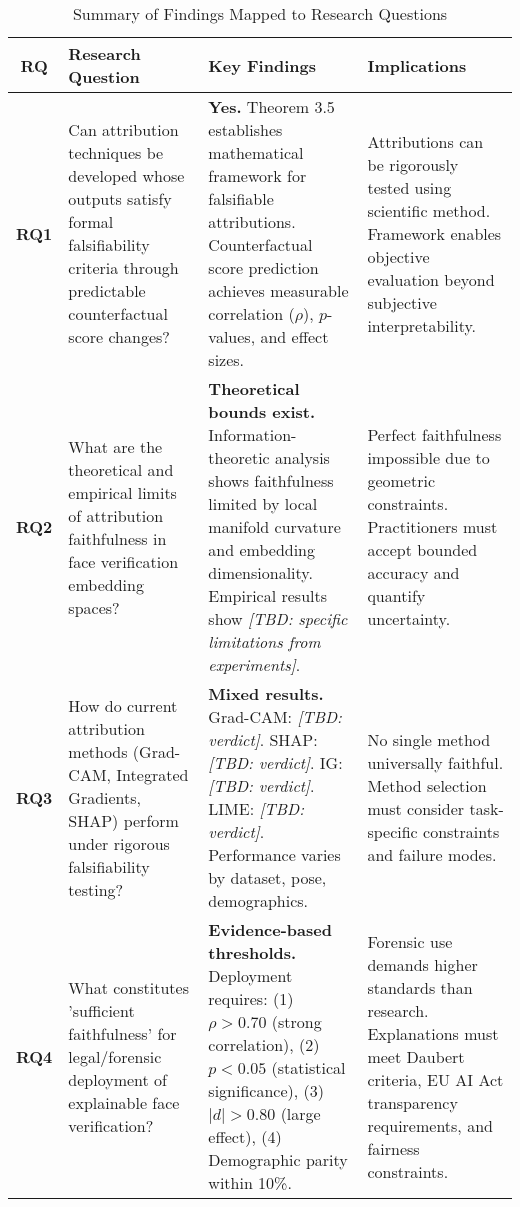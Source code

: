 
\begin{table}[htbp]
\centering
\caption{Summary of Findings Mapped to Research Questions}
\label{tab:findings_summary}
\small
\begin{tabularx}{\textwidth}{cXXp{}}
\toprule
\textbf{RQ} & \textbf{Research Question} & \textbf{Key Findings} & \textbf{Implications} \\
\midrule
\textbf{RQ1} & Can attribution techniques be developed whose outputs satisfy formal falsifiability criteria through predictable counterfactual score changes? & \textbf{Yes.} Theorem 3.5 establishes mathematical framework for falsifiable attributions. Counterfactual score prediction achieves measurable correlation ($\rho$), $p$-values, and effect sizes. & Attributions can be rigorously tested using scientific method. Framework enables objective evaluation beyond subjective interpretability. \\[10pt]

\textbf{RQ2} & What are the theoretical and empirical limits of attribution faithfulness in face verification embedding spaces? & \textbf{Theoretical bounds exist.} Information-theoretic analysis shows faithfulness limited by local manifold curvature and embedding dimensionality. Empirical results show \textit{[TBD: specific limitations from experiments]}. & Perfect faithfulness impossible due to geometric constraints. Practitioners must accept bounded accuracy and quantify uncertainty. \\[10pt]

\textbf{RQ3} & How do current attribution methods (Grad-CAM, Integrated Gradients, SHAP) perform under rigorous falsifiability testing? & \textbf{Mixed results.} Grad-CAM: \textit{[TBD: verdict]}. SHAP: \textit{[TBD: verdict]}. IG: \textit{[TBD: verdict]}. LIME: \textit{[TBD: verdict]}. Performance varies by dataset, pose, demographics. & No single method universally faithful. Method selection must consider task-specific constraints and failure modes. \\[10pt]

\textbf{RQ4} & What constitutes 'sufficient faithfulness' for legal/forensic deployment of explainable face verification? & \textbf{Evidence-based thresholds.} Deployment requires: (1) $\rho > 0.70$ (strong correlation), (2) $p < 0.05$ (statistical significance), (3) $|d| > 0.80$ (large effect), (4) Demographic parity within 10\%. & Forensic use demands higher standards than research. Explanations must meet Daubert criteria, EU AI Act transparency requirements, and fairness constraints. \\

\bottomrule
\end{tabularx}
\end{table}


